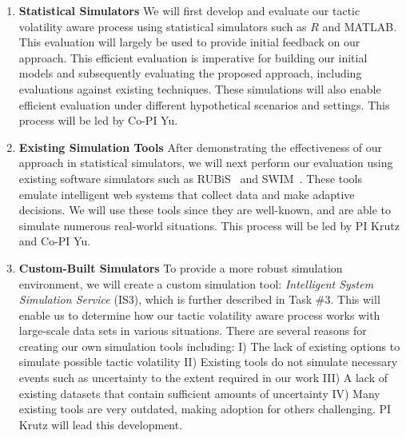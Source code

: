 \documentclass[11pt]{proposalnsf}
\newcommand{\dan}[1]{\textcolor{blue}{{\it [Dan says: #1]}}}
\newlength\q %
\begin{document}
\begin{sloppypar}
\begin{enumerate}[noitemsep]

	\item \textbf{Statistical Simulators} We will first develop and evaluate our tactic volatility aware process using statistical simulators such as $R$ and MATLAB. This evaluation will largely be used to provide initial feedback on our approach. This efficient evaluation is imperative for building our initial models and subsequently evaluating the proposed approach, including evaluations against existing techniques. These simulations will also enable efficient evaluation under different hypothetical scenarios and settings. This process will be led by Co-PI Yu.

	\item \textbf{Existing Simulation Tools} After demonstrating the effectiveness of our approach in statistical simulators, we will next perform our evaluation using existing software simulators such as RUBiS~\cite{Rubis_URL} and SWIM~\cite{SWIM_URL}. These tools emulate intelligent web systems that collect data and make adaptive decisions. We will use these tools since they are well-known, and are able to simulate numerous real-world situations. This process will be led by PI Krutz and Co-PI Yu. %

	\item \textbf{Custom-Built Simulators} To provide a more robust simulation environment, we will create a custom simulation tool: \emph{Intelligent System Simulation Service} (IS3), which is further described in Task \#3. This will enable us to determine how our tactic volatility aware process works with large-scale data sets in various situations. There are several reasons for creating our own simulation tools including: I) The lack of existing options to simulate possible tactic volatility II) Existing tools do not simulate necessary events such as uncertainty to the extent required in our work III) A lack of existing datasets that contain sufficient amounts of uncertainty IV) Many existing tools are very outdated, making adoption for others challenging. PI Krutz will lead this development. %
           

\end{enumerate}
\end{sloppypar}
\end{document}
